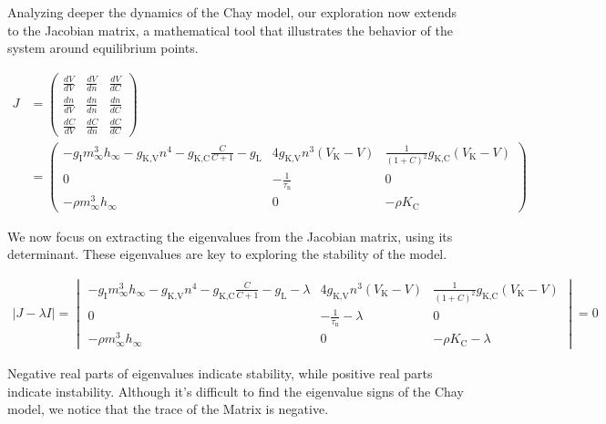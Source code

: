 \documentclass[class={.NoTouch/myProject}, crop=false]{standalone}
\begin{document}
Analyzing deeper the dynamics of the Chay model, our exploration now extends to the Jacobian matrix, a mathematical tool that illustrates the behavior of the system around equilibrium points.

\begin{align*}
     J &= \begin{pmatrix}
        \frac{dV}{dV} & \frac{dV}{dn} & \frac{dV}{dC} \\
        \frac{dn}{dV} & \frac{dn}{dn} & \frac{dn}{dC} \\
        \frac{dC}{dV} & \frac{dC}{dn} & \frac{dC}{dC}
    \end{pmatrix} \\
      &= 
    \begin{pmatrix}
        -g_{\text{I}} m_{\infty}^3 h_{\infty} - g_{\text{K,V}} n^4 - g_{\text{K,C}} \frac{C}{C+1} - g_{\text{L}} & 4 g_{\text{K,V}} n^3 (V_{\text{K}} - V) & \frac{1}{(1+C)^2} g_{\text{K,C}} (V_{\text{K}} - V) \\
        0 & -\frac{1}{\tau_{\text{n}}} & 0 \\
        -\rho m_{\infty}^3 h_{\infty} & 0 & -\rho K_{\text{C}}
    \end{pmatrix}
\end{align*}

We now focus on extracting the eigenvalues from the Jacobian matrix, using its determinant. These eigenvalues are key to exploring the stability of the model.

\begin{align*}
    |J - \lambda I| = 
    \begin{vmatrix}
         -g_{\text{I}} m_{\infty}^3 h_{\infty} - g_{\text{K,V}} n^4 - g_{\text{K,C}} \frac{C}{C+1} - g_{\text{L}} - \lambda & 4 g_{\text{K,V}} n^3 (V_{\text{K}} - V) & \frac{1}{(1+C)^2} g_{\text{K,C}} (V_{\text{K}} - V) \\
         0 & -\frac{1}{\tau_{\text{n}}} - \lambda & 0 \\
         -\rho m_{\infty}^3 h_{\infty} & 0 & -\rho K_{\text{C}} - \lambda
    \end{vmatrix} = 0
\end{align*}

Negative real parts of eigenvalues indicate  stability, while positive real parts  indicate instability. Although it's difficult to find the eigenvalue signs of the Chay model, we notice that the trace of the Matrix is negative.
\end{document}
